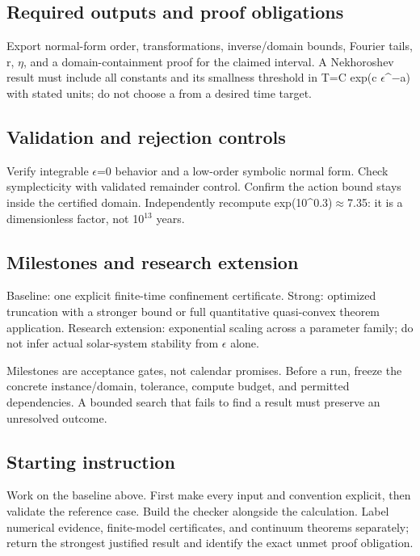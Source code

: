 \documentclass[
  11pt,
]{article}
\begin{document}
\subsection{Required outputs and proof obligations}

Export normal-form order, transformations, inverse/domain bounds,
Fourier tails, r, \ensuremath{\eta}, and a domain-containment proof for
the claimed interval. A Nekhoroshev result must include all constants
and its smallness threshold in T=C exp(c
\ensuremath{\epsilon}\textasciicircum{}\ensuremath{-}a) with stated
units; do not choose a from a desired time target.

\subsection{Validation and rejection controls}

Verify integrable \ensuremath{\epsilon}=0 behavior and a low-order
symbolic normal form. Check symplecticity with validated remainder
control. Confirm the action bound stays inside the certified domain.
Independently recompute
exp(10\textasciicircum{}0.3)\ensuremath{\approx}7.35: it is a
dimensionless factor, not 10\ensuremath{{}^{13}} years.

\subsection{Milestones and research extension}

Baseline: one explicit finite-time confinement certificate. Strong:
optimized truncation with a stronger bound or full quantitative
quasi-convex theorem application. Research extension: exponential
scaling across a parameter family; do not infer actual solar-system
stability from \ensuremath{\epsilon} alone.

Milestones are acceptance gates, not calendar promises. Before a run,
freeze the concrete instance/domain, tolerance, compute budget, and
permitted dependencies. A bounded search that fails to find a result
must preserve an unresolved outcome.

\subsection{Starting instruction}

Work on the baseline above. First make every input and convention
explicit, then validate the reference case. Build the checker alongside
the calculation. Label numerical evidence, finite-model certificates,
and continuum theorems separately; return the strongest justified result
and identify the exact unmet proof obligation.
\end{document}
